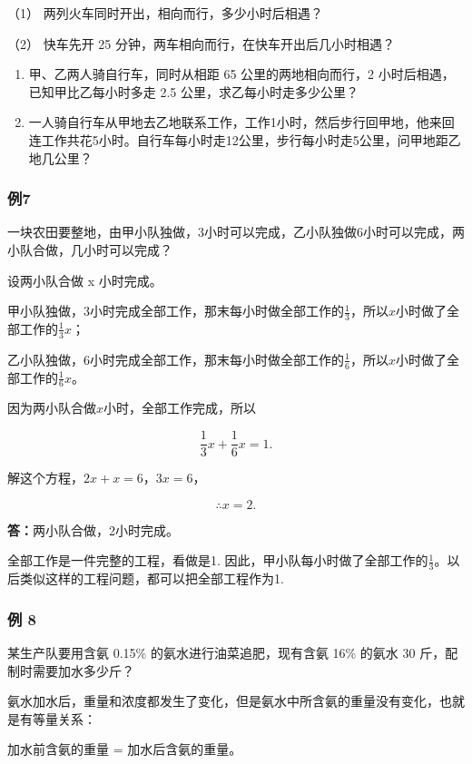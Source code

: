 （1） 两列火车同时开出，相向而行，多少小时后相遇？

（2） 快车先开 25 分钟，两车相向而行，在快车开出后几小时相遇？

\begin{enumerate}[start=7]
\item
  甲、乙两人骑自行车，同时从相距 65 公里的两地相向而行，2
  小时后相遇，已知甲比乙每小时多走 2.5 公里，求乙每小时走多少公里？
\item
  一人骑自行车从甲地去乙地联系工作，工作1小时，然后步行回甲地，他来回连工作共花5小时。自行车每小时走12公里，步行每小时走5公里，问甲地距乙地几公里？
\end{enumerate}

\subsubsection{例7}

一块农田要整地，由甲小队独做，3小时可以完成，乙小队独做6小时可以完成，两小队合做，几小时可以完成？

 设两小队合做 x 小时完成。

甲小队独做，3小时完成全部工作，那末每小时做全部工作的\(\frac{1}{3}\)，所以\(x\)小时做了全部工作的\(\frac{1}{3} x\)；

乙小队独做，6小时完成全部工作，那末每小时做全部工作的\(\frac{1}{6}\)，所以\(x\)小时做了全部工作的\(\frac{1}{6} x\)。

因为两小队合做\(x\)小时，全部工作完成，所以

\[
\frac{1}{3} x + \frac{1}{6} x = 1.
\]

解这个方程，\(2x + x = 6\)，\(3x = 6\)，

\[
\therefore x = 2.
\]

\textbf{答：}两小队合做，2小时完成。

 全部工作是一件完整的工程，看做是1.
因此，甲小队每小时做了全部工作的\(\frac{1}{3}\)。以后类似这样的工程问题，都可以把全部工程作为1.

\subsubsection{例 8}

某生产队要用含氨 0.15\% 的氨水进行油菜追肥，现有含氨 16\% 的氨水 30
斤，配制时需要加水多少斤？

氨水加水后，重量和浓度都发生了变化，但是氨水中所含氨的重量没有变化，也就是有等量关系：

加水前含氨的重量 = 加水后含氨的重量。

